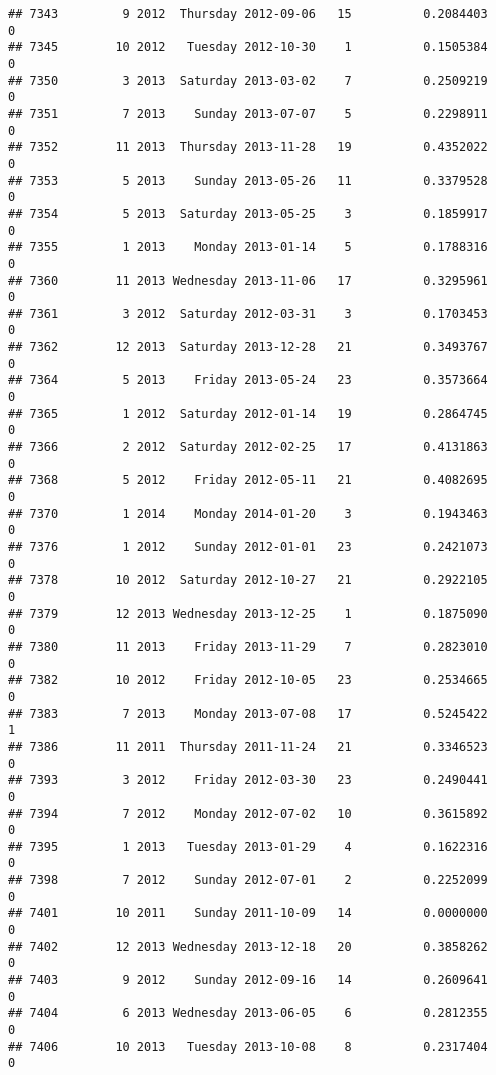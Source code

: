 \documentclass[
]{article}
\begin{document}
\begin{verbatim}
## 7343         9 2012  Thursday 2012-09-06   15          0.2084403             0
## 7345        10 2012   Tuesday 2012-10-30    1          0.1505384             0
## 7350         3 2013  Saturday 2013-03-02    7          0.2509219             0
## 7351         7 2013    Sunday 2013-07-07    5          0.2298911             0
## 7352        11 2013  Thursday 2013-11-28   19          0.4352022             0
## 7353         5 2013    Sunday 2013-05-26   11          0.3379528             0
## 7354         5 2013  Saturday 2013-05-25    3          0.1859917             0
## 7355         1 2013    Monday 2013-01-14    5          0.1788316             0
## 7360        11 2013 Wednesday 2013-11-06   17          0.3295961             0
## 7361         3 2012  Saturday 2012-03-31    3          0.1703453             0
## 7362        12 2013  Saturday 2013-12-28   21          0.3493767             0
## 7364         5 2013    Friday 2013-05-24   23          0.3573664             0
## 7365         1 2012  Saturday 2012-01-14   19          0.2864745             0
## 7366         2 2012  Saturday 2012-02-25   17          0.4131863             0
## 7368         5 2012    Friday 2012-05-11   21          0.4082695             0
## 7370         1 2014    Monday 2014-01-20    3          0.1943463             0
## 7376         1 2012    Sunday 2012-01-01   23          0.2421073             0
## 7378        10 2012  Saturday 2012-10-27   21          0.2922105             0
## 7379        12 2013 Wednesday 2013-12-25    1          0.1875090             0
## 7380        11 2013    Friday 2013-11-29    7          0.2823010             0
## 7382        10 2012    Friday 2012-10-05   23          0.2534665             0
## 7383         7 2013    Monday 2013-07-08   17          0.5245422             1
## 7386        11 2011  Thursday 2011-11-24   21          0.3346523             0
## 7393         3 2012    Friday 2012-03-30   23          0.2490441             0
## 7394         7 2012    Monday 2012-07-02   10          0.3615892             0
## 7395         1 2013   Tuesday 2013-01-29    4          0.1622316             0
## 7398         7 2012    Sunday 2012-07-01    2          0.2252099             0
## 7401        10 2011    Sunday 2011-10-09   14          0.0000000             0
## 7402        12 2013 Wednesday 2013-12-18   20          0.3858262             0
## 7403         9 2012    Sunday 2012-09-16   14          0.2609641             0
## 7404         6 2013 Wednesday 2013-06-05    6          0.2812355             0
## 7406        10 2013   Tuesday 2013-10-08    8          0.2317404             0

\end{verbatim}
\end{document}
